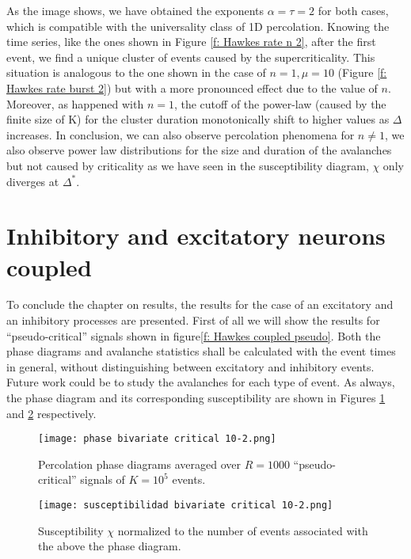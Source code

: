 As the image shows, we have obtained the exponents $\alpha=\tau=2$ for both cases, which is compatible with the universality class of 1D percolation. Knowing the time series, like the ones
shown in Figure \ref{f: Hawkes rate n 2}, after the first event, we find a unique cluster of events caused by the supercriticality. This situation is analogous to the one shown in 
the case of $n=1, \mu=10$ (Figure \ref{f: Hawkes rate burst 2}) but with a more pronounced effect due to the value of $n$. Moreover, as happened with $n=1$, the cutoff of the power-law 
(caused by the finite size of K) for the cluster duration monotonically shift to higher values as $\Delta$ increases.
In conclusion, we can also observe percolation phenomena for 
$n\neq 1$, we also observe power law distributions for the size and duration of the avalanches but not caused by criticality as we have seen in the susceptibility diagram, $\chi$ only diverges
at $\Delta^*$.


\section{Inhibitory and excitatory neurons coupled}

To conclude the chapter on results, the results for the case of an excitatory and an inhibitory processes are presented. First of all we will show the results for ``pseudo-critical'' 
signals shown in figure\ref{f: Hawkes coupled pseudo}. Both the phase diagrams and avalanche statistics shall be calculated with the event times in general, without distinguishing
between excitatory and inhibitory events. Future work could be to study the avalanches for each type of event. As always, the phase diagram and its corresponding susceptibility are shown in
Figures \ref{f:phase_diagram_coupled critical} and \ref{f:susceptibilidad_coupled critical} respectively.

\begin{figure}[H]
    \centering
    \texttt{[image: phase bivariate critical 10-2.png]}
    \caption{Percolation phase diagrams averaged over $R=1000$ ``pseudo-critical'' signals of $K=10^5$ events.}
    \label{f:phase_diagram_coupled critical}
\end{figure}

\begin{figure}[H]
    \centering
    \texttt{[image: susceptibilidad bivariate critical 10-2.png]}
    \caption{Susceptibility $\chi$ normalized to the number of events associated with the above the phase diagram.}
    \label{f:susceptibilidad_coupled critical}
\end{figure}

